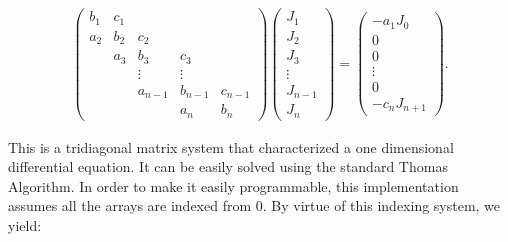 \documentclass[onecolumn, groupedaddress, 10pt]{revtex4-1}
\begin{document}
\begin{align}
\left( \begin{array}{ccccc}
	b_1 & c_1 &         &         &         \\
	a_2 & b_2 &   c_2   &         &         \\
	    & a_3 &   b_3   &   c_3   &         \\
	    &     & \vdots  & \vdots  &         \\
	    &     & a_{n-1} & b_{n-1} & c_{n-1} \\
	    &     &         &   a_n   &   b_n
\end{array} \right)
\left( \begin{array}{c}
	  J_1   \\
	  J_2   \\
	  J_3   \\
	\vdots  \\
	J_{n-1} \\
	  J_n
\end{array} \right)
=
\left( \begin{array}{c}
	  - a_1 J_0   \\
	      0       \\
	      0       \\
	   \vdots     \\
	      0       \\
	- c_n J_{n+1}
\end{array} \right).
\end{align}

This is a tridiagonal matrix system that characterized a one dimensional differential equation.  It can be easily solved using the standard Thomas Algorithm. In order to make it easily programmable, this implementation assumes all the arrays are indexed from 0. By virtue of this indexing system, we yield:
\end{document}
